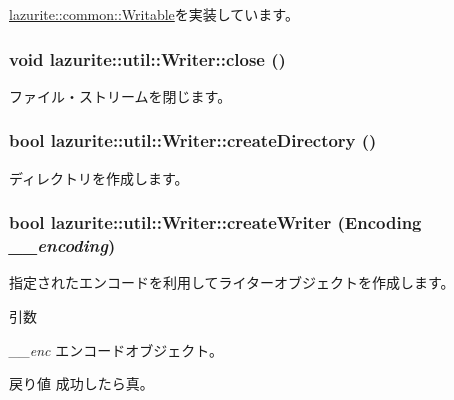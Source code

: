 \hyperlink{interfacelazurite_1_1common_1_1_writable_ab08924bf9f4359d839e406135541b1b1}{lazurite::common::Writable}を実装しています。\hypertarget{classlazurite_1_1util_1_1_writer_a68dcf9775d5b433d3036e9bffb138f00}{
\subsubsection[{close}]{\setlength{\rightskip}{0pt plus 5cm}void lazurite::util::Writer::close ()}}
\label{classlazurite_1_1util_1_1_writer_a68dcf9775d5b433d3036e9bffb138f00}


ファイル・ストリームを閉じます。 \hypertarget{classlazurite_1_1util_1_1_writer_a79c6ba39ea94a6a6be211e7172f944e5}{
\subsubsection[{createDirectory}]{\setlength{\rightskip}{0pt plus 5cm}bool lazurite::util::Writer::createDirectory ()}}
\label{classlazurite_1_1util_1_1_writer_a79c6ba39ea94a6a6be211e7172f944e5}
ディレクトリを作成します。 \hypertarget{classlazurite_1_1util_1_1_writer_aedfaa1434267419700f66c319d7cc9d1}{
\subsubsection[{createWriter}]{\setlength{\rightskip}{0pt plus 5cm}bool lazurite::util::Writer::createWriter (Encoding {\em \_\-\_\-encoding})}}
\label{classlazurite_1_1util_1_1_writer_aedfaa1434267419700f66c319d7cc9d1}
指定されたエンコードを利用してライターオブジェクトを作成します。 
\begin{DoxyParams}{引数}
\item[{\em \_\-\_\-enc}]エンコードオブジェクト。\end{DoxyParams}
\begin{DoxyReturn}{戻り値}
成功したら真。 
\end{DoxyReturn}
